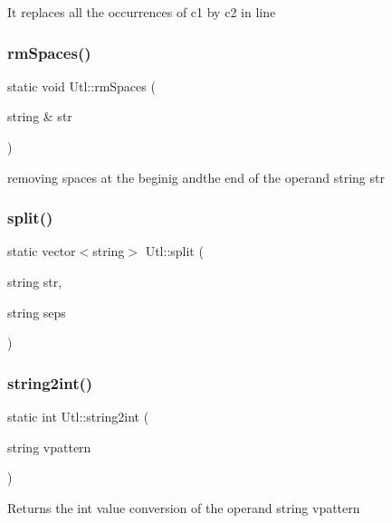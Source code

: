 It replaces all the occurrences of c1 by c2 in line \mbox{\label{classUtl_a23aae7a1cb208168c7b85bcb365ab096}} 
\subsubsection{\texorpdfstring{rm\+Spaces()}{rmSpaces()}}
{\footnotesize\ttfamily static void Utl\+::rm\+Spaces (\begin{DoxyParamCaption}\item[{string \&}]{str }\end{DoxyParamCaption})\hspace{0.3cm}{\ttfamily [static]}}

removing spaces at the beginig andthe end of the operand string str \mbox{\label{classUtl_a02229754bf5fe1d8ecd4e84433cb778d}} 
\subsubsection{\texorpdfstring{split()}{split()}}
{\footnotesize\ttfamily static vector$<$string$>$ Utl\+::split (\begin{DoxyParamCaption}\item[{string}]{str,  }\item[{string}]{seps }\end{DoxyParamCaption})\hspace{0.3cm}{\ttfamily [static]}}

\mbox{\label{classUtl_afbefaa2d4f3c3a5df72f7eb4a292a2e0}} 
\subsubsection{\texorpdfstring{string2int()}{string2int()}}
{\footnotesize\ttfamily static int Utl\+::string2int (\begin{DoxyParamCaption}\item[{string}]{vpattern }\end{DoxyParamCaption})\hspace{0.3cm}{\ttfamily [static]}}

\begin{DoxyReturn}{Returns}
the int value conversion of the operand string vpattern 
\end{DoxyReturn}
\mbox{\label{classUtl_a1b9b25dc1c06005add5e2ba44688632f}} 

